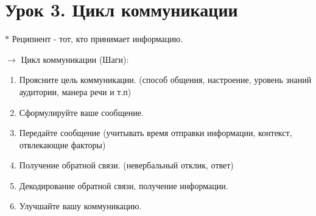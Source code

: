 \documentclass[12pt,a4paper]{report}
\begin{document}
\section*{Урок 3. Цикл коммуникации}
$\ast$ Реципиент - тот, кто принимает информацию.

\bigskip
$\rightarrow$ Цикл коммуникации (Шаги):
\begin{enumerate}
	\item Проясните цель коммуникации. (способ общения, настроение, уровень знаний аудитории, манера речи и т.п)
	\item Сформулируйте ваше сообщение.
	\item Передайте сообщение (учитывать время отправки информации, контекст, отвлекающие факторы)
	\item Получение обратной связи. (невербальный отклик, ответ)
	\item Декодирование обратной связи, получение информации.
	\item Улучшайте вашу коммуникацию. 
\end{enumerate}
\end{document}

